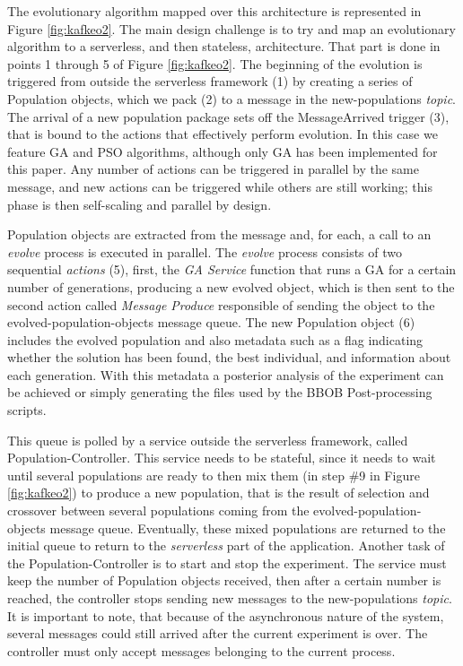 \documentclass[sigconf]{acmart}
\begin{document}
The evolutionary algorithm mapped over this architecture is
represented in Figure \ref{fig:kafkeo2}. The main
design challenge is to try and map an evolutionary algorithm to a
serverless, and then stateless, architecture. That part is done in
points 1 through 5 of Figure \ref{fig:kafkeo2}. The beginning of the
evolution is triggered from outside the serverless framework (1) by
creating a series of Population objects, which we pack (2) to a message in the
{\sf new-populations} {\em topic}. The arrival of a new population
package sets off the {\sf MessageArrived} trigger (3), that is bound to
the actions that effectively perform evolution. In this case we
feature GA and PSO algorithms, although only GA has been implemented
for this paper. Any number of actions can be triggered in parallel by the same message,
and new actions can be triggered while others are still working; this phase is
then self-scaling and parallel by design.

Population objects are extracted from the message and, for each, a call to
an {\em evolve} process is executed in parallel. The {\em evolve} process
consists of two sequential {\em actions} (5), first, the {\em GA Service} function that
runs a GA for a certain number of generations, producing a new evolved
object, which is then sent to the second action called {\em Message Produce}
 responsible of sending the object to the {\sf evolved-population-objects}
 message queue.  The new Population object (6) includes
 the evolved population and also metadata such as a flag indicating
whether the solution has been found, the best individual, and information
about each generation. With this metadata a posterior analysis of the experiment
can be achieved or simply generating the files used by the BBOB Post-processing scripts.

This queue is polled by a service outside the serverless framework, called
{\sf Population-Controller}. This service needs to be stateful, since
it needs to wait until several populations are ready to then mix them (in
step \#9 in Figure \ref{fig:kafkeo2}) to produce a new population, that is the result of selection
and crossover between several populations coming from the {\sf
  evolved-population-objects} message queue. Eventually, these mixed
populations are returned to the initial queue to return to the {\em
  serverless} part of the application. Another task of the
  {\sf Population-Controller} is to start and stop the experiment. The service must
  keep the number of Population objects received, then after
  a certain number is reached, the controller stops sending new messages to the
  {\sf new-populations} {\em topic}. It is important to note, that because of
  the asynchronous nature of the system, several messages could still
  arrived after the current experiment is over. The controller must only
  accept messages belonging to the current process.
\end{document}
